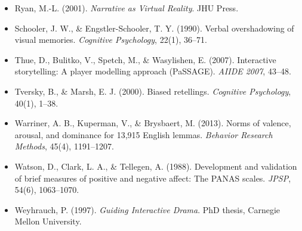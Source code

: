 \documentclass[11pt, a4paper]{article}
\begin{document}
\begin{itemize}
  \item Ryan, M.-L. (2001). \textit{Narrative as Virtual Reality}. JHU Press.
  \item Schooler, J. W., \& Engstler-Schooler, T. Y. (1990). Verbal overshadowing of visual memories. \textit{Cognitive Psychology}, 22(1), 36--71.
  \item Thue, D., Bulitko, V., Spetch, M., \& Wasylishen, E. (2007). Interactive storytelling: A player modelling approach (PaSSAGE). \textit{AIIDE 2007}, 43--48.
  \item Tversky, B., \& Marsh, E. J. (2000). Biased retellings. \textit{Cognitive Psychology}, 40(1), 1--38.
  \item Warriner, A. B., Kuperman, V., \& Brysbaert, M. (2013). Norms of valence, arousal, and dominance for 13,915 English lemmas. \textit{Behavior Research Methods}, 45(4), 1191--1207.
  \item Watson, D., Clark, L. A., \& Tellegen, A. (1988). Development and validation of brief measures of positive and negative affect: The PANAS scales. \textit{JPSP}, 54(6), 1063--1070.
  \item Weyhrauch, P. (1997). \textit{Guiding Interactive Drama}. PhD thesis, Carnegie Mellon University.
\end{itemize}
\end{document}

